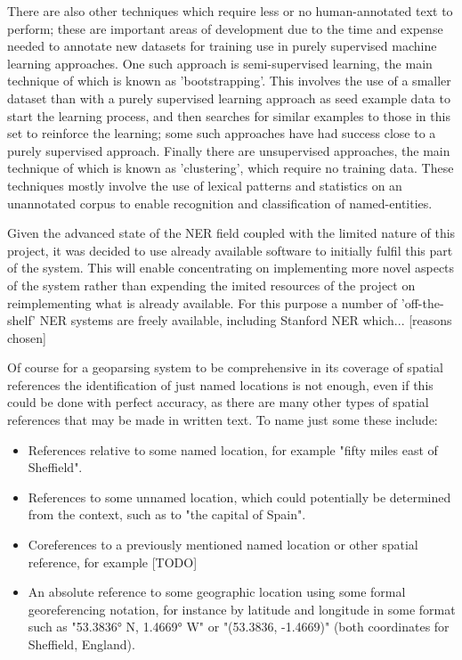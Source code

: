 \documentclass[12pt, a4paper]{report}
\begin{document}
There are also other techniques which require less or no human-annotated text to perform; these are important areas of development due to the time and expense needed to annotate new datasets for training use in purely supervised machine learning approaches. One such approach is semi-supervised learning, the main technique of which is known as 'bootstrapping'. This involves the use of a smaller dataset than with a purely supervised learning approach as seed example data to start the learning process, and then searches for similar examples to those in this set to reinforce the learning; some such approaches have had success close to a purely supervised approach. Finally there are unsupervised approaches, the main technique of which is known as 'clustering', which require no training data. These techniques mostly involve the use of lexical patterns and statistics on an unannotated corpus to enable recognition and classification of named-entities.

Given the advanced state of the NER field coupled with the limited nature of this project, it was decided to use already available software to initially fulfil this part of the system. This  will enable concentrating on implementing more novel aspects of the system rather than expending the imited resources of the project on reimplementing what is already available. For this purpose a number of 'off-the-shelf' NER systems are freely available, including Stanford NER \citep{finkel2005} which... [reasons chosen]

Of course for a geoparsing system to be comprehensive in its coverage of spatial references the identification of just named locations is not enough, even if this could be done with perfect accuracy, as there are many other types of spatial references that may be made in written text. To name just some these include:

\begin{itemize}
	\item { References relative to some named location, for example "fifty miles east of Sheffield". }
	\item { References to some unnamed location, which could potentially be determined from the context, such as to "the capital of Spain".}
	\item { Coreferences to a previously mentioned named location or other spatial reference, for example [TODO]}
	\item { An absolute reference to some geographic location using some formal georeferencing notation, for instance by latitude and longitude in some format such as "53.3836° N, 1.4669° W" or "(53.3836, -1.4669)" (both coordinates for Sheffield, England). }
\end{itemize}
\end{document}
